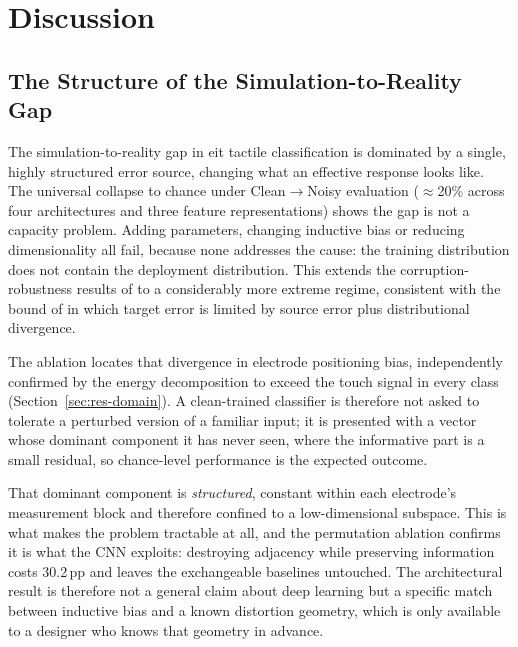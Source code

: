 \chapter{Discussion}
\label{ch:discussion}

\section{The Structure of the Simulation-to-Reality Gap}
\label{sec:disc-gap}

The simulation-to-reality gap in \gls{eit} tactile classification is dominated by a single, highly structured error source, changing what an effective response looks like. The universal collapse to chance under Clean$\to$Noisy evaluation ($\approx$20\% across four architectures and three feature representations) shows the gap is not a capacity problem. Adding parameters, changing inductive bias or reducing dimensionality all fail, because none addresses the cause: the training distribution does not contain the deployment distribution. This extends the corruption-robustness results of \textcite{hendrycks2019} to a considerably more extreme regime, consistent with the bound of \textcite{ben-david2010domain} in which target error is limited by source error plus distributional divergence.

The ablation locates that divergence in electrode positioning bias, independently confirmed by the energy decomposition to exceed the touch signal in every class (Section~\ref{sec:res-domain}). A clean-trained classifier is therefore not asked to tolerate a perturbed version of a familiar input; it is presented with a vector whose dominant component it has never seen, where the informative part is a small residual, so chance-level performance is the expected outcome.

That dominant component is \emph{structured}, constant within each electrode's measurement block and therefore confined to a low-dimensional subspace. This is what makes the problem tractable at all, and the permutation ablation confirms it is what the CNN exploits: destroying adjacency while preserving information costs 30.2\,pp and leaves the exchangeable baselines untouched. The architectural result is therefore not a general claim about deep learning but a specific match between inductive bias and a known distortion geometry, which is only available to a designer who knows that geometry in advance.

